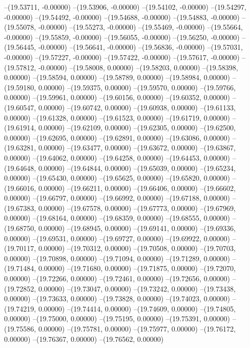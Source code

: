 --(19.53711, -0.00000)
--(19.53906, -0.00000)
--(19.54102, -0.00000)
--(19.54297, -0.00000)
--(19.54492, -0.00000)
--(19.54688, -0.00000)
--(19.54883, -0.00000)
--(19.55078, -0.00000)
--(19.55273, -0.00000)
--(19.55469, -0.00000)
--(19.55664, -0.00000)
--(19.55859, -0.00000)
--(19.56055, -0.00000)
--(19.56250, -0.00000)
--(19.56445, -0.00000)
--(19.56641, -0.00000)
--(19.56836, -0.00000)
--(19.57031, -0.00000)
--(19.57227, -0.00000)
--(19.57422, -0.00000)
--(19.57617, -0.00000)
--(19.57812, -0.00000)
--(19.58008, 0.00000)
--(19.58203, 0.00000)
--(19.58398, 0.00000)
--(19.58594, 0.00000)
--(19.58789, 0.00000)
--(19.58984, 0.00000)
--(19.59180, 0.00000)
--(19.59375, 0.00000)
--(19.59570, 0.00000)
--(19.59766, 0.00000)
--(19.59961, 0.00000)
--(19.60156, 0.00000)
--(19.60352, 0.00000)
--(19.60547, 0.00000)
--(19.60742, 0.00000)
--(19.60938, 0.00000)
--(19.61133, 0.00000)
--(19.61328, 0.00000)
--(19.61523, 0.00000)
--(19.61719, 0.00000)
--(19.61914, 0.00000)
--(19.62109, 0.00000)
--(19.62305, 0.00000)
--(19.62500, 0.00000)
--(19.62695, 0.00000)
--(19.62891, 0.00000)
--(19.63086, 0.00000)
--(19.63281, 0.00000)
--(19.63477, 0.00000)
--(19.63672, 0.00000)
--(19.63867, 0.00000)
--(19.64062, 0.00000)
--(19.64258, 0.00000)
--(19.64453, 0.00000)
--(19.64648, 0.00000)
--(19.64844, 0.00000)
--(19.65039, 0.00000)
--(19.65234, 0.00000)
--(19.65430, 0.00000)
--(19.65625, 0.00000)
--(19.65820, 0.00000)
--(19.66016, 0.00000)
--(19.66211, 0.00000)
--(19.66406, 0.00000)
--(19.66602, 0.00000)
--(19.66797, 0.00000)
--(19.66992, 0.00000)
--(19.67188, 0.00000)
--(19.67383, 0.00000)
--(19.67578, 0.00000)
--(19.67773, 0.00000)
--(19.67969, 0.00000)
--(19.68164, 0.00000)
--(19.68359, 0.00000)
--(19.68555, 0.00000)
--(19.68750, 0.00000)
--(19.68945, 0.00000)
--(19.69141, 0.00000)
--(19.69336, 0.00000)
--(19.69531, 0.00000)
--(19.69727, 0.00000)
--(19.69922, 0.00000)
--(19.70117, 0.00000)
--(19.70312, 0.00000)
--(19.70508, 0.00000)
--(19.70703, 0.00000)
--(19.70898, 0.00000)
--(19.71094, 0.00000)
--(19.71289, 0.00000)
--(19.71484, 0.00000)
--(19.71680, 0.00000)
--(19.71875, 0.00000)
--(19.72070, 0.00000)
--(19.72266, 0.00000)
--(19.72461, 0.00000)
--(19.72656, 0.00000)
--(19.72852, 0.00000)
--(19.73047, 0.00000)
--(19.73242, 0.00000)
--(19.73438, 0.00000)
--(19.73633, 0.00000)
--(19.73828, 0.00000)
--(19.74023, 0.00000)
--(19.74219, 0.00000)
--(19.74414, 0.00000)
--(19.74609, 0.00000)
--(19.74805, 0.00000)
--(19.75000, 0.00000)
--(19.75195, 0.00000)
--(19.75391, 0.00000)
--(19.75586, 0.00000)
--(19.75781, 0.00000)
--(19.75977, 0.00000)
--(19.76172, 0.00000)
--(19.76367, 0.00000)
--(19.76562, 0.00000)
